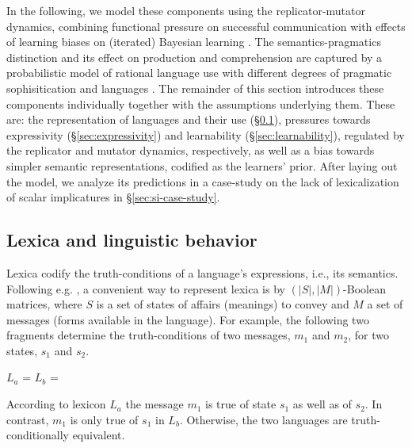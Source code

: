 \documentclass[a4paper]{article}
\begin{document}
In the following, we model these components using the replicator-mutator dynamics, combining functional pressure on successful communication with effects of learning biases on (iterated) Bayesian learning \citep{griffiths+kalish:2007}. The semantics-pragmatics distinction and its effect on production and comprehension are captured by a probabilistic model of rational language use with different degrees of pragmatic sophisitication and languages \citep{frank+goodman:2012,franke+jaeger:2014, bergen+etal:2016}. The remainder of this section introduces these components individually together with the assumptions underlying them. These are: the representation of languages and their use (\S\ref{sec:languages+use}), pressures towards expressivity (\S\ref{sec:expressivity}) and learnability (\S\ref{sec:learnability}), regulated by the replicator and mutator dynamics, respectively, as well as a bias towards simpler semantic representations, codified as the learners' prior. After laying out the model, we analyze its predictions in a case-study on the lack of lexicalization of scalar implicatures in \S\ref{sec:si-case-study}.  



\subsection{Lexica and linguistic behavior}\label{sec:languages+use}
Lexica codify the truth-conditions of a language's expressions, i.e., its semantics. Following e.g. \citet{franke+jaeger:2014}, a convenient way to represent lexica is by $(|S|,|M|)$-Boolean matrices, where $S$ is a set of states of affairs (meanings) to convey and $M$ a set of messages (forms available in the language). For example, the following two fragments determine the truth-conditions of two messages, $m_1$ and $m_2$, for two states, $s_1$ and $s_2$.

\begin{centering}
$L_a$ =  \hspace{2cm} $L_b$ = \\[0.5cm]
\end{centering}


According to lexicon $L_a$ the message $m_1$ is true of state $s_1$ as well as of $s_2$. In contrast, $m_1$ is only true of $s_1$ in $L_b$. Otherwise, the two languages are truth-conditionally equivalent. 
\end{document}
